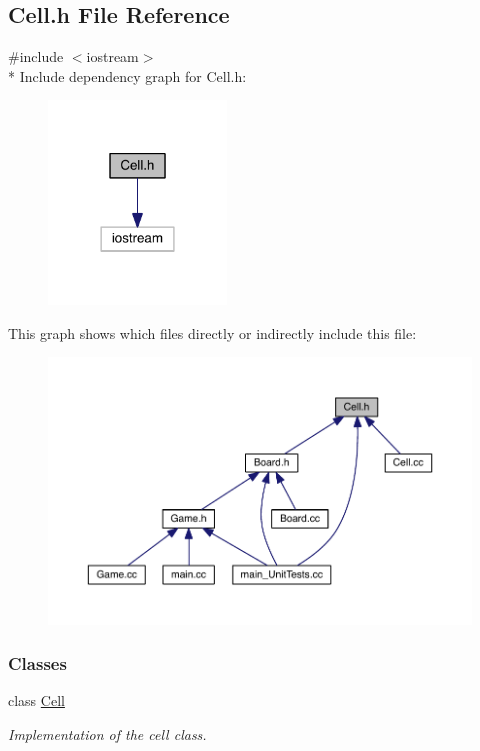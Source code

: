 \hypertarget{a00096}{}\subsection{Cell.\+h File Reference}
\label{a00096}
{\ttfamily \#include $<$iostream$>$}\\*
Include dependency graph for Cell.\+h\+:\nopagebreak
\begin{figure}[H]
\begin{center}
\leavevmode
\includegraphics[width=134pt]{a00132}
\end{center}
\end{figure}
This graph shows which files directly or indirectly include this file\+:\nopagebreak
\begin{figure}[H]
\begin{center}
\leavevmode
\includegraphics[width=350pt]{a00133}
\end{center}
\end{figure}
\subsubsection*{Classes}
\begin{DoxyCompactItemize}
\item 
class \hyperlink{a00011}{Cell}
\begin{DoxyCompactList}\small\item\em Implementation of the cell class. \end{DoxyCompactList}\end{DoxyCompactItemize}
